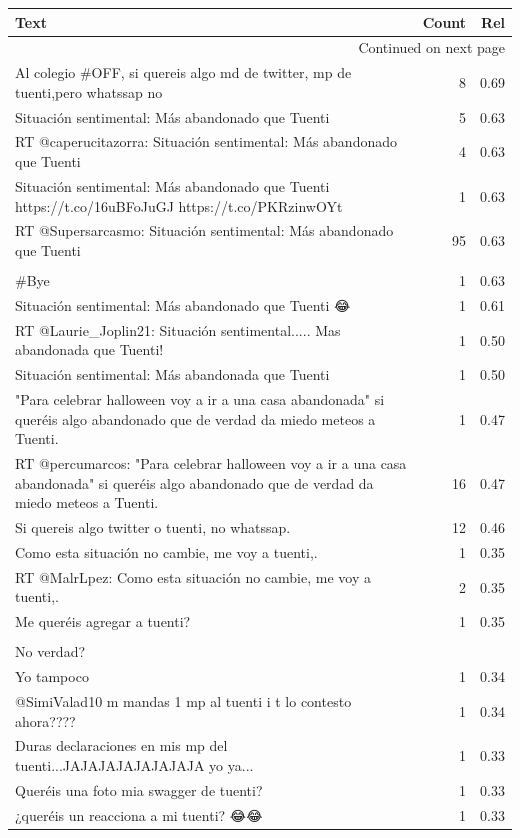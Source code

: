 \begin{longtable}{p{12.5cm}rr}
\toprule
Text & Count & Rel \\
\midrule
\endhead
\midrule
\multicolumn{3}{r}{{Continued on next page}} \\
\midrule
\endfoot

\bottomrule
\endlastfoot
Al colegio \#OFF, si quereis algo md de twitter, mp de tuenti,pero whatssap no & 8 & 0.69 \\
Situación sentimental: Más abandonado que Tuenti & 5 & 0.63 \\
RT @caperucitazorra: Situación sentimental: Más abandonado que Tuenti & 4 & 0.63 \\
Situación sentimental: Más abandonado que Tuenti https://t.co/16uBFoJuGJ https://t.co/PKRzinwOYt & 1 & 0.63 \\
RT @Supersarcasmo: Situación sentimental: Más abandonado que Tuenti & 95 & 0.63 \\
\begin{tabular}[c]{@{}l@{}}Situación sentimental: Más abandonado que Tuenti. \\ \#Bye\end{tabular} & 1 & 0.63 \\
Situación sentimental: Más abandonado que Tuenti 😂 & 1 & 0.61 \\
RT @Laurie\_Joplin21: Situación sentimental..... Mas abandonada que Tuenti! & 1 & 0.50 \\
Situación sentimental: Más abandonada que Tuenti & 1 & 0.50 \\
"Para celebrar halloween voy a ir a una casa abandonada" si queréis algo abandonado que de verdad da miedo meteos a Tuenti. & 1 & 0.47 \\
RT @percumarcos: "Para celebrar halloween voy a ir a una casa abandonada" si queréis algo abandonado que de verdad da miedo meteos a Tuenti. & 16 & 0.47 \\
Si quereis algo twitter o tuenti, no whatssap. & 12 & 0.46 \\
Como esta situación no cambie, me voy a tuenti,. & 1 & 0.35 \\
RT @MalrLpez: Como esta situación no cambie, me voy a tuenti,. & 2 & 0.35 \\
Me queréis agregar a tuenti? & 1 & 0.35 \\
\begin{tabular}[c]{@{}l@{}}Queréis ver mi tuenti? \\ No verdad? \\ Yo tampoco\end{tabular} & 1 & 0.34 \\
@SimiValad10 m mandas 1 mp al tuenti i t lo contesto ahora???? & 1 & 0.34 \\
Duras declaraciones en mis mp del tuenti...JAJAJAJAJAJAJAJA yo ya... & 1 & 0.33 \\
Queréis una foto mia swagger de tuenti? & 1 & 0.33 \\
¿queréis un reacciona a mi tuenti? 😂😂 & 1 & 0.33 \\

\end{longtable}
\clearpage

